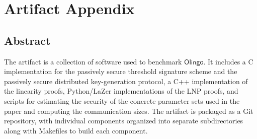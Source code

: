 \documentclass[nonacm,sigconf]{acmart}
\begin{document}

\appendix

\section{Artifact Appendix}




\subsection{Abstract}


The artifact is a collection of software used to benchmark
$\mathsf{Olingo}$. It includes a C implementation for the passively secure
threshold signature scheme and the passively secure distributed key-generation
protocol, a C++ implementation of the linearity proofs, Python/LaZer implementations of the LNP proofs, and scripts for estimating the security of the concrete parameter sets
used in the paper and computing the communication sizes. The artifact is packaged as a Git repository, with individual components
organized into separate subdirectories along with Makefiles to build each
component.
\end{document}
